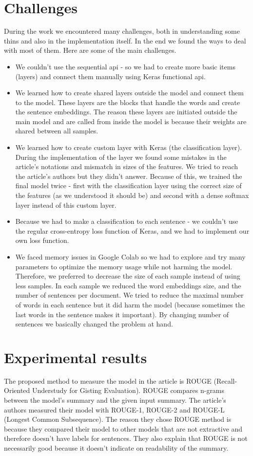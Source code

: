 \documentclass{article}
\begin{document}
\section{Challenges}
During the work we encountered many challenges, both in understanding some thins and also in the implementation itself. In the end we found the ways to deal with most of them. Here are some of the main challenges.
\begin{itemize}
    \item We couldn't use the sequential api - so we had to create more basic items (layers) and connect them manually using Keras functional api.
    \item We learned how to create shared layers outside the model and connect them to the model. These layers are the blocks that handle the words and create the sentence embeddings. The reason these layers are initiated outside the main model and are called from inside the model is because their weights are shared between all samples.
    \item We learned how to create custom layer with Keras (the classification layer). During the implementation of the layer we found some mistakes in the article's notations and mismatch in sizes of the features. We tried to reach the article's authors but they didn't answer. Because of this, we trained the final model twice - first with the classification layer using the correct size of the features (as we understood it should be) and second with a dense softmax layer instead of this custom layer.
    \item Because we had to make a classification to each sentence - we couldn't use the regular cross-entropy loss function of Keras, and we had to implement our own loss function.
    \item We faced memory issues in Google Colab so we had to explore and try many parameters to optimize the memory usage while not harming the model. Therefore, we preferred to decrease the size of each sample instead of using less samples. In each sample we reduced the word embeddings size, and the number of sentences per document. We tried to reduce the maximal number of words in each sentence but it did harm the model (because sometimes the last words in the sentence makes it important). By changing number of sentences we basically changed the problem at hand.
\end{itemize}

\section{Experimental results}
The proposed method to measure the model in the article is ROUGE (Recall-Oriented Understudy for Gisting Evaluation). 
ROUGE compares n-grams between the model's summary and the given input summary. The article's authors measured their model with ROUGE-1, ROUGE-2 and ROUGE-L (Longest Common Subsequence). The reason they chose ROUGE method is because they compared their model to other models that are not extractive and therefore doesn't have labels for sentences. They also explain that ROUGE is not necessarily good because it doesn't indicate on readability of the summary.
\end{document}
